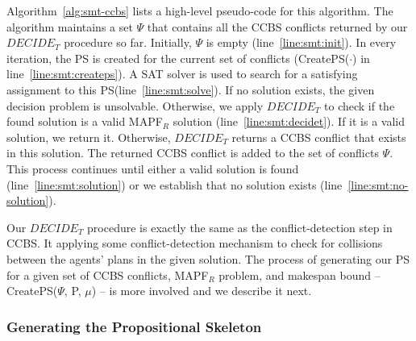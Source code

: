 \documentclass[review]{elsarticle}
\newcommand{\implicitct}{\textit{ImplicitCT}\xspace}
\newcommand{\decidet}{\ensuremath{\mathit{DECIDE_T}}\xspace}
\newcommand{\ccbs}{\ac{CCBS}\xspace}
\newcommand{\ct}{\ac{CT}\xspace}
\newcommand{\ps}{\ac{PS}\xspace}
\newcommand{\mapfr}{\ac{MAPF}$_R$\xspace}
\newcommand{\mapf}{\ac{MAPF}\xspace}
\begin{document}
Algorithm~\ref{alg:smt-ccbs} lists a high-level pseudo-code for this algorithm. 
The algorithm maintains a set $\Psi$ that contains all the \ccbs conflicts returned by our \decidet procedure so far. 
Initially, $\Psi$ is empty (line~\ref{line:smt:init}). 
In every iteration, the \ps is created for the current set of conflicts (CreatePS($\cdot$) in line~\ref{line:smt:createps}). 
A SAT solver is used to search for a satisfying assignment to this \ps (line~\ref{line:smt:solve}). 
If no solution exists, the given decision problem is unsolvable. 
Otherwise, we apply \decidet to check if the found solution is a valid \mapfr solution (line~\ref{line:smt:decidet}). 
If it is a valid solution, we return it.
Otherwise, \decidet returns a \ccbs conflict that exists in this solution. 
The returned \ccbs conflict is added to the set of conflicts $\Psi$. 
This process continues until either a valid solution is found (line~\ref{line:smt:solution}) or we establish that no solution exists (line~\ref{line:smt:no-solution}).



Our \decidet procedure is exactly the same as the conflict-detection step in \ccbs. 
It applying some conflict-detection mechanism to check for collisions between the agents' plans in the given solution. 
The process of generating our \ps for a given set of \ccbs conflicts, \mapfr problem, and makespan bound -- CreatePS($\Psi$, P, $\mu$) -- is more involved and we describe it next. 







\subsubsection{Generating the Propositional Skeleton}
\label{sec:propositional-skeleton}





\end{document}
